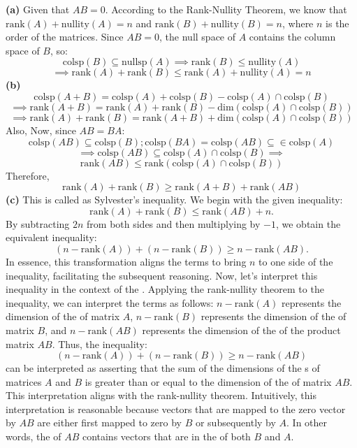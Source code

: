 \documentclass{article}
\begin{document}
\textbf{(a)} Given that $AB = 0$. According to the Rank-Nullity Theorem, we know that $\text{rank}(A) + \text{nullity}(A) = n$ and $\text{rank}(B) + \text{nullity}(B) = n$, where $n$ is the order of the matrices. Since $AB = 0$, the null space of $A$ contains the column space of $B$, so:
$$\text{colsp}(B) \subseteq \text{nullsp}(A) \implies \text{rank}(B) \leq\text{nullity}(A)$$
$$\implies \text{rank}(A) + \text{rank}(B) \leq \text{rank}(A) + \text{nullity}(A) = n$$
\newline
\textbf{(b)}
$$\text{colsp}(A + B) = \text{colsp}(A) + \text{colsp}(B) - \text{colsp}(A) \cap \text{colsp}(B)$$
$$\implies \text{rank}(A + B) = \text{rank}(A) + \text{rank}(B) - \text{dim}(\text{colsp}(A) \cap \text{colsp}(B))$$
$$\implies  \text{rank}(A) + \text{rank}(B) =  \text{rank}(A + B) + \text{dim}(\text{colsp}(A) \cap \text{colsp}(B))$$
Also,
Now, since $AB = BA$:
$$\text{colsp}(AB) \subseteq \text{colsp}(B); \text{colsp}(BA) = \text{colsp}(AB) \subseteq \in \text{colsp}(A)$$
$$\implies \text{colsp}(AB) \subseteq \text{colsp}(A) \cap \text{colsp}(B) \implies $$
$$\text{rank}(AB) \leq \text{rank}(\text{colsp}(A) \cap \text{colsp}(B))$$
Therefore,
$$\text{rank}(A) + \text{rank}(B) \geq   \text{rank}(A + B) + \text{rank}(AB)$$
\newline
\textbf{(c)} This is called as Sylvester's inequality. We begin with the given inequality:
\[
\text{{rank}}(A) + \text{{rank}}(B) \leq \text{{rank}}(AB) + n.
\]
By subtracting \(2n\) from both sides and then multiplying by \(-1\), we obtain the equivalent inequality:
\[
(n - \text{{rank}}(A)) + (n - \text{{rank}}(B)) \geq n - \text{{rank}}(AB).
\]
In essence, this transformation aligns the terms to bring \(n\) to one side of the inequality, facilitating the subsequent reasoning. Now, let's interpret this inequality in the context of the . Applying the rank-nullity theorem to the inequality, we can interpret the terms as follows: \(n - \text{{rank}}(A)\) represents the dimension of the  of matrix \(A\),  \(n - \text{{rank}}(B)\) represents the dimension of the  of matrix \(B\), and \(n - \text{{rank}}(AB)\) represents the dimension of the  of the product matrix \(AB\). Thus, the inequality:
\[
(n - \text{{rank}}(A)) + (n - \text{{rank}}(B)) \geq n - \text{{rank}}(AB)
\]
can be interpreted as asserting that the sum of the dimensions of the s of matrices \(A\) and \(B\) is greater than or equal to the dimension of the  of matrix \(AB\). This interpretation aligns with the rank-nullity theorem. Intuitively, this interpretation is reasonable because vectors that are mapped to the zero vector by \(AB\) are either first mapped to zero by \(B\) or subsequently by \(A\). In other words, the  of \(AB\) contains vectors that are in the  of both \(B\) and \(A\).
\end{document}

